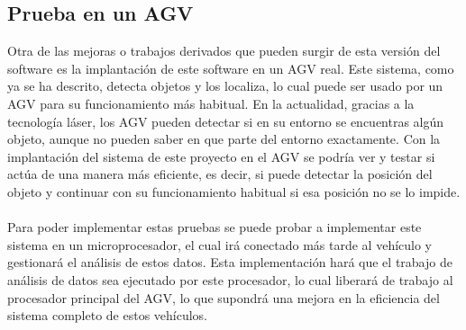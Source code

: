 \subsection{Prueba en un AGV}
Otra de las mejoras o trabajos derivados que pueden surgir de esta versión del software es la implantación de este software en un AGV real. Este sistema, como ya se ha descrito, detecta objetos y los localiza, lo cual puede ser usado por un AGV para su funcionamiento más habitual. En la actualidad, gracias a la tecnología láser, los AGV pueden detectar si en su entorno se encuentras algún objeto, aunque no pueden saber en que parte del entorno exactamente. Con la implantación del sistema de este proyecto en el AGV se podría ver y testar si actúa de una manera más eficiente, es decir, si puede detectar la posición del objeto y continuar con su funcionamiento habitual si esa posición no se lo impide.\\
\\
Para poder implementar estas pruebas se puede probar a implementar este sistema en un microprocesador, el cual irá conectado más tarde al vehículo y gestionará el análisis de estos datos. Esta implementación hará que el trabajo de análisis de datos sea ejecutado por este procesador, lo cual liberará de trabajo al procesador principal del AGV, lo que supondrá una mejora en la eficiencia del sistema completo de estos vehículos.